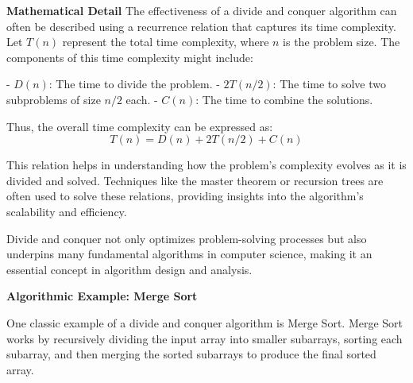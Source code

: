 \documentclass[12pt]{book} %
\begin{document}
\textbf{Mathematical Detail}
The effectiveness of a divide and conquer algorithm can often be described using a recurrence relation that captures its time complexity. Let \( T(n) \) represent the total time complexity, where \( n \) is the problem size. The components of this time complexity might include:

- \( D(n) \): The time to divide the problem.
- \( 2T(n/2) \): The time to solve two subproblems of size \( n/2 \) each.
- \( C(n) \): The time to combine the solutions.

Thus, the overall time complexity can be expressed as:
\[
T(n) = D(n) + 2T(n/2) + C(n)
\]

This relation helps in understanding how the problem's complexity evolves as it is divided and solved. Techniques like the master theorem or recursion trees are often used to solve these relations, providing insights into the algorithm’s scalability and efficiency.

Divide and conquer not only optimizes problem-solving processes but also underpins many fundamental algorithms in computer science, making it an essential concept in algorithm design and analysis.


\textbf{Algorithmic Example: Merge Sort}

One classic example of a divide and conquer algorithm is Merge Sort. Merge Sort works by recursively dividing the input array into smaller subarrays, sorting each subarray, and then merging the sorted subarrays to produce the final sorted array.
\end{document}
